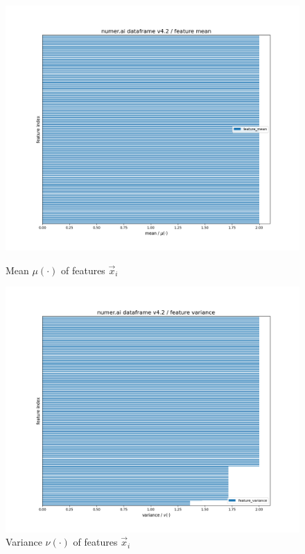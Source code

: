 \documentclass[12pt, a4paper]{article}
\begin{document}
\begin{figure}[htbp]
\begin{minipage}[t]{8.8cm}
\vspace{0pt}
\centering
\includegraphics[width=1\textwidth,trim={0 0 0 0},clip]{figures/train_df_features_mean_horizontal_barplot_2024-02-29.png}
\caption[Mean of Features]{Mean $\mu(\cdot)$ of features $\vec{x}_i$}
\label{fig: features_mean}
\end{minipage}
\hfill
\begin{minipage}[t]{8.8cm}
\vspace{0pt}
\centering
\includegraphics[width=1\textwidth,trim={0 0 0 0},clip]{figures/train_df_features_variance_horizontal_barplot_2024-02-29.png}
\caption[Variance of Features]{Variance $\nu(\cdot)$ of features $\vec{x}_i$ }
\label{fig: features_variance}
\end{minipage}
\end{figure}
\end{document}
